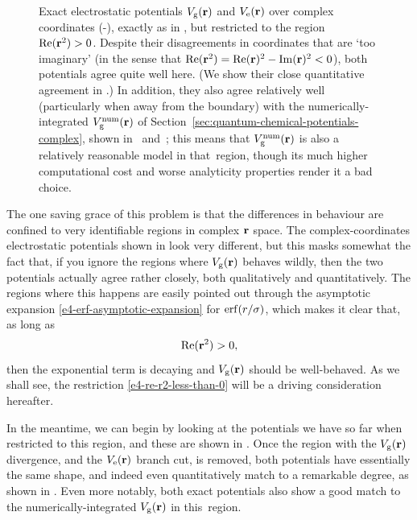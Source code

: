 \begin{figure}[!htbp]
  \caption[Electrostatic potentials $\Vg(\vbr)$, $\Ve(\vbr)$ and $\Vgnum(\vbr)$ over complex coordinates restricted to $\Re(\vbr^2)>0$]{
  Exact electrostatic potentials $\Vg(\vbr)$ and $\Ve(\vbr)$ over complex coordinates (-), exactly as in , but restricted to the region $\Re(\vbr^2)>0$. Despite their disagreements in coordinates that are `too imaginary' (in the sense that $\Re(\vb{r}^2)=\Re(\vb{r})^2-\Im(\vb{r})^2<0$), both potentials agree quite well here. (We show their close quantitative agreement in .) In addition, they also agree relatively well (particularly when away from the boundary) with the numerically-integrated $\Vgnum(\vbr)$ of Section~\ref{sec:quantum-chemical-potentials-complex}, shown in~ and~; this means that $\Vgnum(\vbr)$ is also a relatively reasonable model in that~region, though its much higher computational cost and worse analyticity properties render it a bad choice.}
  \label{f4-potentials-comparison-restricted-complex-coordinates}
\end{figure}


The one saving grace of this problem is that the differences in behaviour are confined to very identifiable regions in complex $\vb{r}$ space. The complex-coordinates electrostatic potentials shown in  look very different, but this masks somewhat the fact that, if you ignore the regions where $\Vg(\vbr)$ behaves wildly, then the two potentials actually agree rather closely, both qualitatively and quantitatively. The regions where this happens are easily pointed out through the asymptotic expansion \eqref{e4-erf-asymptotic-expansion} for $\erf(r/\sigma)$, which makes it clear that, as long as
%
\begin{equation}
\Re(\vb{r}^2)>0,
\label{e4-re-r2-less-than-0}
\end{equation}
%
then the exponential term is decaying and $\Vg(\vbr)$ should be well-behaved. As we shall see, the restriction \eqref{e4-re-r2-less-than-0} will be a driving consideration hereafter.

In the meantime, we can begin by looking at the potentials we have so far when restricted to this region, and these are shown in . Once the region with the $\Vg(\vbr)$ divergence, and the $\Ve(\vbr)$ branch cut, is removed, both potentials have essentially the same shape, and indeed even quantitatively match to a remarkable degree, as shown in . Even more notably, both exact potentials also show a good match to the numerically-integrated $\Vg(\vbr)$ in this~region.



